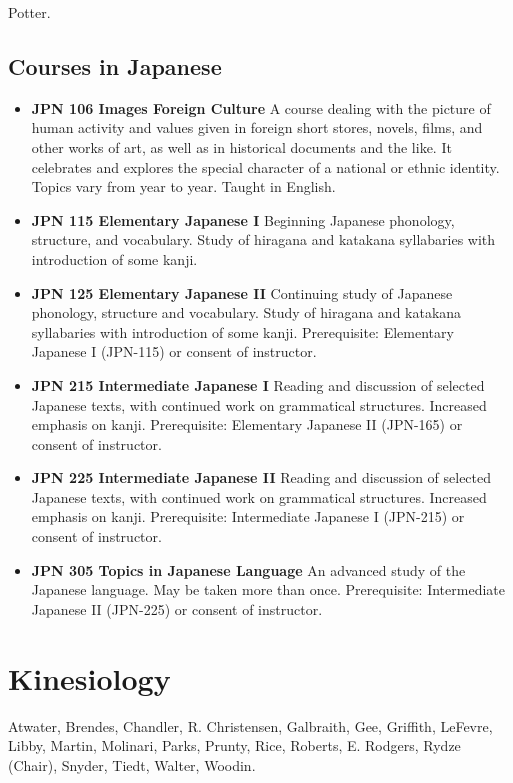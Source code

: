 \documentclass[
  letterpaper,
]{scrbook}
\providecommand{\tightlist}{%
  \setlength{\itemsep}{0pt}\setlength{\parskip}{0pt}}
\begin{document}
Potter.

\subsection{Courses in Japanese}\label{courses-in-japanese}

\begin{itemize}
\tightlist
\item
  \textbf{JPN 106 Images Foreign Culture} A course dealing with the
  picture of human activity and values given in foreign short stores,
  novels, films, and other works of art, as well as in historical
  documents and the like. It celebrates and explores the special
  character of a national or ethnic identity. Topics vary from year to
  year. Taught in English.
\item
  \textbf{JPN 115 Elementary Japanese I} Beginning Japanese phonology,
  structure, and vocabulary. Study of hiragana and katakana syllabaries
  with introduction of some kanji.
\item
  \textbf{JPN 125 Elementary Japanese II} Continuing study of Japanese
  phonology, structure and vocabulary. Study of hiragana and katakana
  syllabaries with introduction of some kanji. Prerequisite: Elementary
  Japanese I (JPN-115) or consent of instructor.
\item
  \textbf{JPN 215 Intermediate Japanese I} Reading and discussion of
  selected Japanese texts, with continued work on grammatical
  structures. Increased emphasis on kanji. Prerequisite: Elementary
  Japanese II (JPN-165) or consent of instructor.
\item
  \textbf{JPN 225 Intermediate Japanese II} Reading and discussion of
  selected Japanese texts, with continued work on grammatical
  structures. Increased emphasis on kanji. Prerequisite: Intermediate
  Japanese I (JPN-215) or consent of instructor.
\item
  \textbf{JPN 305 Topics in Japanese Language} An advanced study of the
  Japanese language. May be taken more than once. Prerequisite:
  Intermediate Japanese II (JPN-225) or consent of instructor.
\end{itemize}

\section{Kinesiology}\label{sec-kinesiology}

Atwater, Brendes, Chandler, R. Christensen, Galbraith, Gee, Griffith,
LeFevre, Libby, Martin, Molinari, Parks, Prunty, Rice, Roberts, E.
Rodgers, Rydze (Chair), Snyder, Tiedt, Walter, Woodin.
\end{document}
